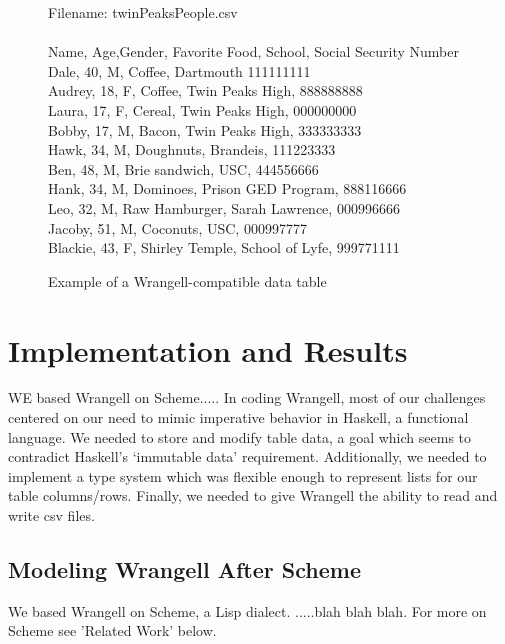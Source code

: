\documentclass[preprint,nocopyrightspace]{sig-alternate}
\begin{document}
\begin{figure}
\caption{Example of a Wrangell-compatible data table}
Filename: twinPeaksPeople.csv
\\\\
Name,   Age,Gender,	Favorite Food,	School,				Social Security Number \\
Dale,   40,	M,		Coffee,			Dartmouth			111111111\\
Audrey, 18,	F,		Coffee,			Twin Peaks High,	888888888\\
Laura,  17,	F,		Cereal,			Twin Peaks High,	000000000\\
Bobby,  17,	M,		Bacon,			Twin Peaks High,	333333333\\
Hawk,   34,	M,		Doughnuts,		Brandeis,			111223333\\
Ben,    48,	M,		Brie sandwich,	USC,				444556666\\
Hank,   34,	M,		Dominoes,		Prison GED Program,	888116666\\
Leo,    32,	M,		Raw Hamburger,	Sarah Lawrence,		000996666\\
Jacoby,  51, M,		Coconuts,		USC,				000997777\\
Blackie,	43, F,	Shirley Temple,	School of Lyfe,		999771111\\	
\label{exampleTable}	
\end{figure} 
\twocolumn


\section{Implementation and Results}
WE based Wrangell on Scheme.....
In coding Wrangell, most of our challenges centered on our need to mimic imperative behavior in Haskell, a functional language. We needed to store and modify table data, a goal which seems to contradict Haskell's `immutable data' requirement. Additionally, we needed to implement a type system which was flexible enough to represent lists for our table columns/rows. Finally, we needed to give Wrangell the ability to read and write csv files.  

\subsection{Modeling Wrangell After Scheme}
We based Wrangell on Scheme, a Lisp dialect. .....blah blah blah. For more on Scheme see 'Related Work' below. 
\end{document}

